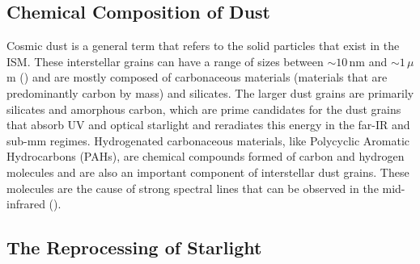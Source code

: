 \subsection{Chemical Composition of Dust}

Cosmic dust is a general term that refers to the solid particles that exist in the ISM. These interstellar grains can have a range of sizes between $\sim 10\,$nm and $\sim 1\,\mu$m (\citealt{Kim_1994, Galliano_2018}) and are mostly composed of carbonaceous materials (materials that are predominantly carbon by mass) and silicates. The larger dust grains are primarily silicates and amorphous carbon, which are prime candidates for the dust grains that absorb UV and optical starlight and reradiates this energy in the far-IR and sub-mm regimes. Hydrogenated carbonaceous materials, like Polycyclic Aromatic Hydrocarbons (PAHs), are chemical compounds formed of carbon and hydrogen molecules and are also an important component of interstellar dust grains. These molecules are the cause of strong spectral lines that can be observed in the mid-infrared (\citealt{Tielens_1987, Draine_2007a, Draine_2007b}).

\subsection{The Reprocessing of Starlight}

